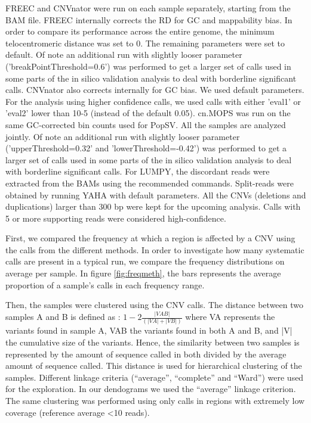 {\sf FREEC} and {\sf CNVnator} were run on each sample separately, starting from the BAM file. {\sf FREEC} internally corrects the RD for GC and mappability bias. In order to compare its performance across the entire genome, the minimum telocentromeric distance was set to 0. The remaining parameters were set to default. Of note an additional run with slightly looser parameter ('breakPointThreshold=0.6') was performed to get a larger set of calls used in some parts of the in silico validation analysis to deal with borderline significant calls. {\sf CNVnator} also corrects internally for GC bias. We used default parameters. For the analysis using higher confidence calls, we used calls with either 'eval1' or 'eval2' lower than 10-5 (instead of the default 0.05).
{\sf cn.MOPS} was run on the same GC-corrected bin counts used for {\sf PopSV}. All the samples are analyzed jointly. Of note an additional run with slightly looser parameter ('upperThreshold=0.32' and 'lowerThreshold=-0.42') was performed to get a larger set of calls used in some parts of the in silico validation analysis to deal with borderline significant calls.
For {\sf LUMPY}, the discordant reads were extracted from the BAMs using the recommended commands. Split-reads were obtained by running {\sf YAHA}\citep{Faust2012} with default parameters. All the CNVs (deletions and duplications) larger than 300 bp were kept for the upcoming analysis. Calls with 5 or more supporting reads were considered high-confidence.

First, we compared the frequency at which a region is affected by a CNV using the calls from the different methods. In order to investigate how many systematic calls are present in a typical run, we compare the frequency distributions on average per sample. In figure \ref{fig:freqmeth}, the bars represents the average proportion of a sample's calls in each frequency range.

Then, the samples were clustered using the CNV calls. The distance between two samples A and B is defined as : $1-2 \frac{|VAB|}{(|VA|+|VB|)}$ where VA represents the variants found in sample A, VAB the variants found in both A and B, and |V| the cumulative size of the variants. Hence, the similarity between two samples is represented by the amount of sequence called in both divided by the average amount of sequence called. This distance is used for hierarchical clustering of the samples. Different linkage criteria (``average'', ``complete'' and ``Ward'') were used for the exploration. In our dendograms we used the ``average'' linkage criterion. The same clustering was performed using only calls in regions with extremely low coverage (reference average <10 reads).

